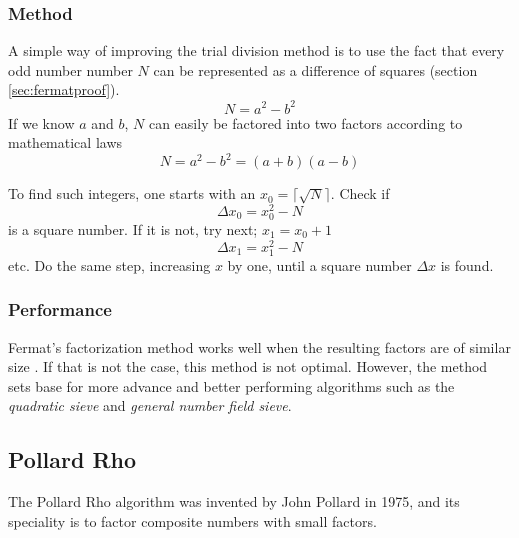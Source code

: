 \documentclass[a4paper, 12pt]{report}
\begin{document}
\subsubsection{Method}
A simple way of improving the trial division method is to use the fact that every odd number number $N$ can be represented as a difference of squares (section \ref{sec:fermatproof}).
\begin{equation}
N = a^2 - b^2
\end{equation}
If we know $a$ and $b$, $N$ can easily be factored into two factors according to mathematical laws
\begin{equation}
N = a^2 - b^2 = (a + b)(a - b)
\end{equation}

To find such integers, one starts with an $x_0 = \lceil \sqrt{N} \rceil $. Check if 
\begin{equation}
\Delta x_0 = x_0^2 - N
\end{equation}
is a square number. If it is not, try next; $x_1 = x_0 + 1$
\begin{equation}
\Delta x_1 = x_1^2 - N
\end{equation}
etc. Do the same step, increasing $x$ by one, until a square number $ \Delta x $ is found.

\subsubsection{Performance}
Fermat's factorization method works well when the resulting factors are of similar size \cite{mathdep}. If that is not the case, this method is not optimal. However, the method sets base for more advance and better performing algorithms such as the \emph{quadratic sieve} and \emph{general number field sieve}.

\subsection{Pollard Rho}
The Pollard Rho algorithm was invented by John Pollard in 1975, and its speciality is to factor composite numbers with small factors.
\end{document}
